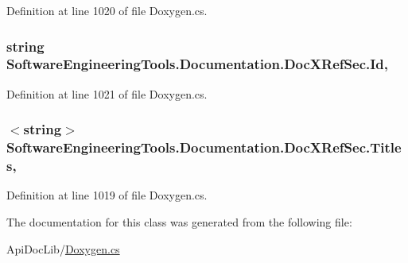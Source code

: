 Definition at line 1020 of file Doxygen.\+cs.

\hypertarget{class_software_engineering_tools_1_1_documentation_1_1_doc_x_ref_sec_ade8835c29857041292035ab076a75758}{
\subsubsection[{Id}]{\setlength{\rightskip}{0pt plus 5cm}string Software\+Engineering\+Tools.\+Documentation.\+Doc\+X\+Ref\+Sec.\+Id\hspace{0.3cm}{\ttfamily [get]}, {\ttfamily [set]}}}\label{class_software_engineering_tools_1_1_documentation_1_1_doc_x_ref_sec_ade8835c29857041292035ab076a75758}


Definition at line 1021 of file Doxygen.\+cs.

\hypertarget{class_software_engineering_tools_1_1_documentation_1_1_doc_x_ref_sec_ad5f128cab197b2d237a5d8481af6173a}{
\subsubsection[{Titles}]{$<$string$>$ Software\+Engineering\+Tools.\+Documentation.\+Doc\+X\+Ref\+Sec.\+Titles\hspace{0.3cm}{\ttfamily [get]}, {\ttfamily [set]}}}\label{class_software_engineering_tools_1_1_documentation_1_1_doc_x_ref_sec_ad5f128cab197b2d237a5d8481af6173a}


Definition at line 1019 of file Doxygen.\+cs.



The documentation for this class was generated from the following file\+:\begin{DoxyCompactItemize}
\item 
Api\+Doc\+Lib/\hyperlink{_doxygen_8cs}{Doxygen.\+cs}\end{DoxyCompactItemize}
